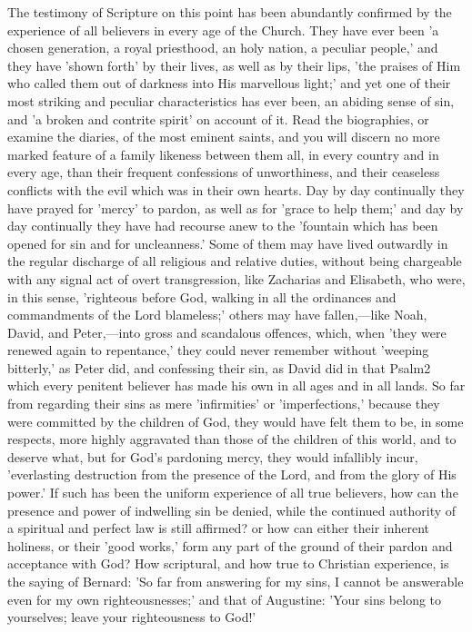 \documentclass[
]{book}
\begin{document}
The testimony of Scripture on this point has been abundantly confirmed by the experience of all believers in every age of the Church. They have ever been 'a chosen generation, a royal priesthood, an holy nation, a peculiar people,' and they have 'shown forth' by their lives, as well as by their lips, 'the praises of Him who called them out of darkness into His marvellous light;' and yet one of their most striking and peculiar characteristics has ever been, an abiding sense of sin, and 'a broken and contrite spirit' on account of it. Read the biographies, or examine the diaries, of the most eminent saints, and you will discern no more marked feature of a family likeness between them all, in every country and in every age, than their frequent confessions of unworthiness, and their ceaseless conflicts with the evil which was in their own hearts. Day by day continually they have prayed for 'mercy' to pardon, as well as for 'grace to help them;' and day by day continually they have had recourse anew to the 'fountain which has been opened for sin and for uncleanness.' Some of them may have lived outwardly in the regular discharge of all religious and relative duties, without being chargeable with any signal act of overt transgression, like Zacharias and Elisabeth, who were, in this sense, 'righteous before God, walking in all the ordinances and commandments of the Lord blameless;' others may have fallen,---like Noah, David, and Peter,---into gross and scandalous offences, which, when 'they were renewed again to repentance,' they could never remember without 'weeping bitterly,' as Peter did, and confessing their sin, as David did in that Psalm2 which every penitent believer has made his own in all ages and in all lands. So far from regarding their sins as mere 'infirmities' or 'imperfections,' because they were committed by the children of God, they would have felt them to be, in some respects, more highly aggravated than those of the children of this world, and to deserve what, but for God's pardoning mercy, they would infallibly incur, 'everlasting destruction from the presence of the Lord, and from the glory of His power.' If such has been the uniform experience of all true believers, how can the presence and power of indwelling sin be denied, while the continued authority of a spiritual and perfect law is still affirmed? or how can either their inherent holiness, or their 'good works,' form any part of the ground of their pardon and acceptance with God? How scriptural, and how true to Christian experience, is the saying of Bernard: 'So far from answering for my sins, I cannot be answerable even for my own righteousnesses;' and that of Augustine: 'Your sins belong to yourselves; leave your righteousness to God!'
\end{document}
